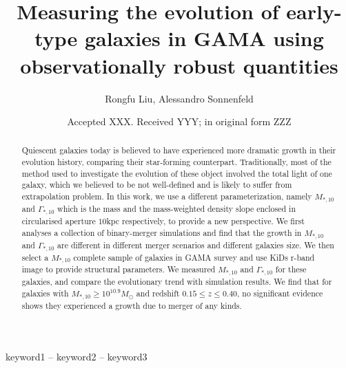 \documentclass[fleqn,usenatbib]{mnras}
\title[Short title, max. 45 characters]{Measuring the evolution of early-type galaxies in GAMA using observationally robust  quantities}
\author[Rongfu Liu et al.]{
Rongfu Liu, Alessandro Sonnenfeld
}
\date{Accepted XXX. Received YYY; in original form ZZZ}
\begin{document}
\label{firstpage}
\pagerange{\pageref{firstpage}--\pageref{lastpage}}
\maketitle

\begin{abstract}
Quiescent galaxies today is believed to have experienced more dramatic growth in their evolution history, comparing their star-forming counterpart. Traditionally, most of the method used to investigate the evolution of these object involved the total light of one galaxy, which we believed to be not well-defined and is likely to suffer from extrapolation problem. In this work, we use a different parameterization, namely $M_{*,10}$ and $\Gamma_{*,10}$ which is the mass and the mass-weighted density slope enclosed in circularised aperture $10$kpc respectively, to provide a new perspective. We first analyses a collection of binary-merger simulations and find that the growth in $M_{*,10}$ and $\Gamma_{*,10}$ are different in different merger scenarios and different galaxies size. We then select a $M_{*,10}$ complete sample of galaxies in GAMA survey and use KiDs r-band image to provide structural parameters. We measured $M_{*,10}$ and $\Gamma_{*,10}$ for these galaxies, and compare the evolutionary trend with simulation results. We find that for galaxies with $M_{*,10} \geq 10^{10.9} M_{\odot}$ and redshift $0.15 \leq z \leq 0.40$, no significant evidence shows they experienced a growth due to merger of any kinds.  
\end{abstract}

\begin{keywords}
keyword1 -- keyword2 -- keyword3
\end{keywords}


\end{document}

